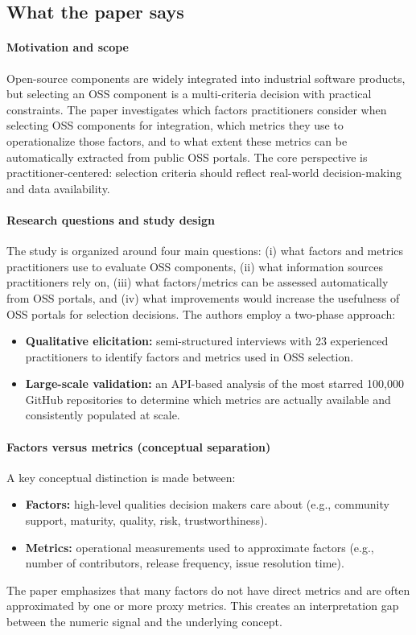 \documentclass[11pt,a4paper]{article}
\begin{document}
\subsection{What the paper says}
\paragraph{Motivation and scope}
Open-source components are widely integrated into industrial software products, but selecting an OSS component is a multi-criteria decision with practical constraints. The paper investigates which factors practitioners consider when selecting OSS components for integration, which metrics they use to operationalize those factors, and to what extent these metrics can be automatically extracted from public OSS portals. The core perspective is practitioner-centered: selection criteria should reflect real-world decision-making and data availability.

\paragraph{Research questions and study design}
The study is organized around four main questions: (i) what factors and metrics practitioners use to evaluate OSS components, (ii) what information sources practitioners rely on, (iii) what factors/metrics can be assessed automatically from OSS portals, and (iv) what improvements would increase the usefulness of OSS portals for selection decisions. The authors employ a two-phase approach:
\begin{itemize}[leftmargin=*]
  \item \textbf{Qualitative elicitation:} semi-structured interviews with 23 experienced practitioners to identify factors and metrics used in OSS selection.
  \item \textbf{Large-scale validation:} an API-based analysis of the most starred 100{,}000 GitHub repositories to determine which metrics are actually available and consistently populated at scale.
\end{itemize}

\paragraph{Factors versus metrics (conceptual separation)}
A key conceptual distinction is made between:
\begin{itemize}[leftmargin=*]
  \item \textbf{Factors:} high-level qualities decision makers care about (e.g., community support, maturity, quality, risk, trustworthiness).
  \item \textbf{Metrics:} operational measurements used to approximate factors (e.g., number of contributors, release frequency, issue resolution time).
\end{itemize}
The paper emphasizes that many factors do not have direct metrics and are often approximated by one or more proxy metrics. This creates an interpretation gap between the numeric signal and the underlying concept.
\end{document}
